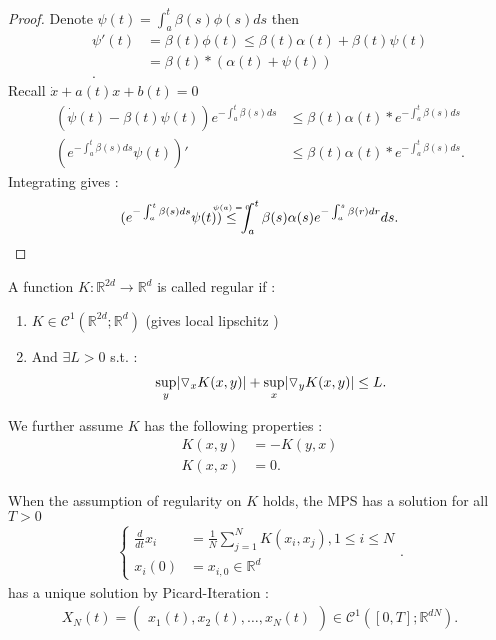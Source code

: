 \begin{proof}[Proof]
  Denote $\psi(t) = \int_a^{t} \beta(s) \phi(s) ds $ then 
  \begin{align*}
    \psi'(t) &= \beta(t)\phi(t) \le \beta(t)\alpha(t) + \beta(t)\psi(t) \\
             &= \beta(t) * (\alpha(t) + \psi(t))\\
  .\end{align*}
  Recall $\dot{x} + a(t)x + b(t) = 0$
  \begin{align*}
    (\dot{\psi}(t) - \beta(t)\psi(t) )e^{- \int_a^{t}\beta(s) ds } &\le  \beta(t)\alpha(t)*e^{-\int_a^{t} \beta(s) ds } \\
    (e^{- \int_a^{t}\beta(s) ds } \psi(t))' &\le \beta(t) \alpha(t)*e^{-\int_a^{t} \beta(s) ds } 
  .\end{align*}
  Integrating gives : 
  \begin{align*}
    (e^{- \int_a^{t}\beta(s) ds } \psi(t)) \myS{$\psi(a) =0$}{\le } \int_a^{t} \beta(s) \alpha(s) e^{-\int_a^{s}\beta(r) dr } ds  
  .\end{align*}
\end{proof}
\begin{definition}[Regularity]
  A function $K : \mathbb{R}^{2d} \to \mathbb{R}^{d}  $ is called regular if :
  \begin{enumerate}
    \item $K \in  \mathcal{C}^{1}(\mathbb{R}^{2d};\mathbb{R}^{d}  ) $ (gives local lipschitz ) 
    \item And $\exists  L >0 $ s.t. : 
      \begin{align*}
        \sup_{y} \lvert\triangledown_x K(x,y) \rvert + \sup_{x} \lvert\triangledown_y K(x,y)\rvert  \le L
      .\end{align*}
  \end{enumerate} 
\end{definition}
We further assume $K$ has the following properties :
\begin{align*}
  K(x,y) &= -K(y,x) \tag{antisymmetric}\\
    K(x,x) &= 0 
.\end{align*}
 \begin{theorem}
 When the assumption of regularity on $K$  holds, the MPS has a solution for all $T>0$
\begin{align*}
  \begin{cases}
    \frac{d}{dt} x_i &= \frac{1}{N} \sum_{j=1}^{N} K(x_i,x_j) ,  1\le i \le N \\ 
    x_i(0)  &= x_{i,0} \in \mathbb{R}^{d} 
  \end{cases}
 .\end{align*}
 has a unique solution by Picard-Iteration : 
 \begin{align*}
   X_N(t) = \begin{pmatrix} x_1(t),x_2(t),\ldots ,x_N(t) \end{pmatrix}  \in \mathcal{C}^{1}([0,T];\mathbb{R}^{dN} ) 
 .\end{align*}
 \end{theorem}

